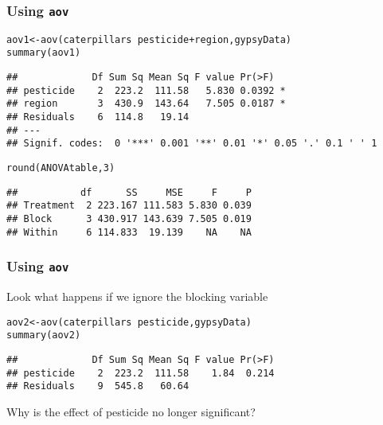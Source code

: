\documentclass[color=usenames,dvipsnames]{beamer}\usepackage[]{graphicx}\usepackage[]{color}
\makeatletter
\newcommand{\hlnum}[1]{\textcolor[rgb]{0.69,0.494,0}{#1}}%
\newcommand{\hlopt}[1]{\textcolor[rgb]{0,0,0}{#1}}%
\newcommand{\hlstd}[1]{\textcolor[rgb]{0,0,0}{#1}}%
\newcommand{\hlkwb}[1]{\textcolor[rgb]{0,0.341,0.682}{#1}}%
\newcommand{\hlkwd}[1]{\textcolor[rgb]{0.004,0.004,0.506}{#1}}%
\newenvironment{kframe}{%
 \def\at@end@of@kframe{}%
 \ifinner\ifhmode%
  \def\at@end@of@kframe{\end{minipage}}%
  \begin{minipage}{\columnwidth}%
 \fi\fi%
 \def\FrameCommand##1{\hskip\@totalleftmargin \hskip-\fboxsep
 \colorbox{shadecolor}{##1}\hskip-\fboxsep
     \hskip-\linewidth \hskip-\@totalleftmargin \hskip\columnwidth}%
 \MakeFramed {\advance\hsize-\width
   \@totalleftmargin\z@ \linewidth\hsize
   \@setminipage}}%
 {\par\unskip\endMakeFramed%
 \at@end@of@kframe}
\newenvironment{knitrout}{}{} %
\makeatother
\begin{document}
\begin{frame}[fragile]
  \frametitle{Using {\tt aov}}
  \small
\begin{knitrout}
\color{fgcolor}\begin{kframe}
\begin{alltt}
\hlstd{aov1} \hlkwb{<-} \hlkwd{aov}\hlstd{(caterpillars} \hlopt{~} \hlstd{pesticide} \hlopt{+} \hlstd{region, gypsyData)}
\hlkwd{summary}\hlstd{(aov1)}
\end{alltt}
\begin{verbatim}
##             Df Sum Sq Mean Sq F value Pr(>F)  
## pesticide    2  223.2  111.58   5.830 0.0392 *
## region       3  430.9  143.64   7.505 0.0187 *
## Residuals    6  114.8   19.14                 
## ---
## Signif. codes:  0 '***' 0.001 '**' 0.01 '*' 0.05 '.' 0.1 ' ' 1
\end{verbatim}
\end{kframe}
\end{knitrout}
\pause
\begin{knitrout}
\color{fgcolor}\begin{kframe}
\begin{alltt}
\hlkwd{round}\hlstd{(ANOVAtable,} \hlnum{3}\hlstd{)}
\end{alltt}
\begin{verbatim}
##           df      SS     MSE     F     P
## Treatment  2 223.167 111.583 5.830 0.039
## Block      3 430.917 143.639 7.505 0.019
## Within     6 114.833  19.139    NA    NA
\end{verbatim}
\end{kframe}
\end{knitrout}
\end{frame}


\begin{frame}[fragile]
  \frametitle{Using {\tt aov}}
  { Look what happens if we ignore the blocking variable \par}
  \small
\begin{knitrout}
\color{fgcolor}\begin{kframe}
\begin{alltt}
\hlstd{aov2} \hlkwb{<-} \hlkwd{aov}\hlstd{(caterpillars} \hlopt{~} \hlstd{pesticide, gypsyData)}
\hlkwd{summary}\hlstd{(aov2)}
\end{alltt}
\begin{verbatim}
##             Df Sum Sq Mean Sq F value Pr(>F)
## pesticide    2  223.2  111.58    1.84  0.214
## Residuals    9  545.8   60.64
\end{verbatim}
\end{kframe}
\end{knitrout}
\pause
\vfill
  { Why is the effect of pesticide no longer significant? \\}
\end{frame}
\end{document}

